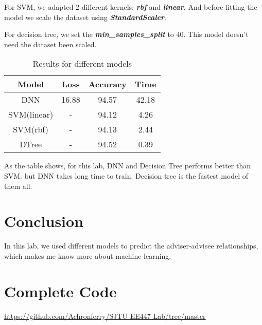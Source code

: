\documentclass[12pt]{report}
\begin{document}
For SVM, we adapted 2 different kernels: \textbf{\textit{rbf}} and \textbf{\textit{linear}}. And before fitting the model we scale the dataset using \textit{\textbf{StandardScaler}}.

For decision tree, we set the \textbf{\textit{min\_samples\_split}} to 40. This model doesn't need the dataset been scaled.


\begin{table}[!htbp]
	\centering
	\begin{tabular}{cccc}
		\toprule
		Model & Loss & Accuracy & Time \\
		\midrule
		DNN & 16.88 & 94.57 & 42.18 \\
		SVM(linear) & - & 94.12 & 4.26 \\
		SVM(rbf) & - & 94.13 & 2.44 \\
		DTree & - & 94.52 & 0.39 \\
		\bottomrule
	\end{tabular}
	\caption{Results for different models}
	\label{fig:1}
\end{table}

As the table shows, for this lab, DNN and Decision Tree performs better than SVM. but DNN takes long time to train. Decision tree is the fastest model of them all.

\section{Conclusion}
In this lab, we used different models to predict the adviser-advisee relationships, which makes me know more about machine learning.
\section{Complete Code}
\noindent\url{https://github.com/Achronferry/SJTU-EE447-Lab/tree/master}
\end{document}
